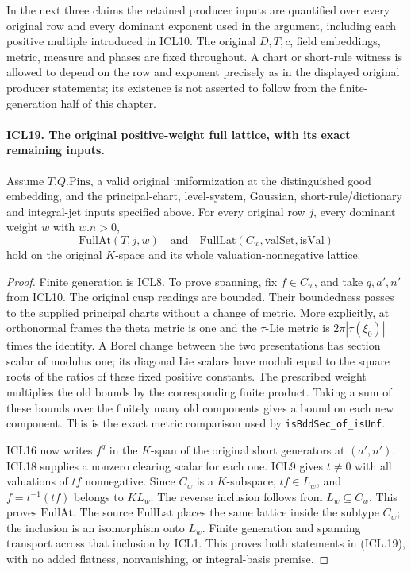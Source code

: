 \documentclass[11pt,a4paper]{article}
\numberwithin{equation}{section}
\theoremstyle{remark}\newtheorem{remark}[theorem]{Remark}
\begin{document}
In the next three claims the retained producer inputs are
quantified over every original row and every dominant
exponent used in the argument, including each positive
multiple introduced in ICL10.  The original \(D,T,c\),
field embeddings, metric, measure and phases are fixed
throughout.  A chart or short-rule witness is allowed to
depend on the row and exponent precisely as in the
displayed original producer statements; its existence
is not asserted to follow from the finite-generation
half of this chapter.

\paragraph{ICL19. The original positive-weight full lattice, with its exact remaining inputs.}
\label{claim:ICL19}
Assume \(T.Q.\mathrm{Pins}\), a valid original
uniformization at the distinguished good embedding,
and the principal-chart, level-system, Gaussian,
short-rule/dictionary and integral-jet inputs specified
above.  For every original row \(j\), every dominant
weight \(w\) with \(w.n>0\),
\[
 \mathrm{FullAt}(T,j,w)
 \quad\text{and}\quad
 \mathrm{FullLat}(C_w,\mathrm{valSet},\mathrm{isVal})
                                                               \tag{ICL.19}
\]
hold on the original \(K\)-space and its whole
valuation-nonnegative lattice.
\begin{proof}
Finite generation is ICL8.  To prove spanning, fix
\(f\in C_w\), and take \(q,a',n'\) from ICL10.
The original cusp readings are bounded.  Their
boundedness passes to the supplied principal charts
without a change of metric.  More explicitly, at
orthonormal frames the theta metric is one and the
\(\tau\)-Lie metric is
\(2\pi|\tau(\xi_0)|\) times the identity.  A Borel
change between the two presentations has section
scalar of modulus one; its diagonal Lie scalars
have moduli equal to the square roots of the ratios
of these fixed positive constants.  The prescribed
weight multiplies the old bounds by the corresponding
finite product.  Taking a sum of these bounds over
the finitely many old components gives a bound on
each new component.  This is the exact metric
comparison used by \texttt{is\allowbreak Bdd\allowbreak Sec\_\allowbreak of\_\allowbreak is\allowbreak Unf}.

ICL16 now writes \(f^q\) in the \(K\)-span of
the original short generators at \((a',n')\).
ICL18 supplies a nonzero clearing scalar for each
one.  ICL9 gives \(t\ne0\) with all valuations
of \(tf\) nonnegative.  Since \(C_w\) is a
\(K\)-subspace, \(tf\in L_w\), and
\(f=t^{-1}(tf)\) belongs to \(K L_w\).  The
reverse inclusion follows from \(L_w\subseteq C_w\).
This proves \(\mathrm{FullAt}\).  The source
\(\mathrm{FullLat}\) places the same lattice inside
the subtype \(C_w\); the inclusion is an isomorphism
onto \(L_w\).  Finite generation and spanning
transport across that inclusion by ICL1.  This
proves both statements in (ICL.19), with no added
flatness, nonvanishing, or integral-basis premise.
\end{proof}
\end{document}
